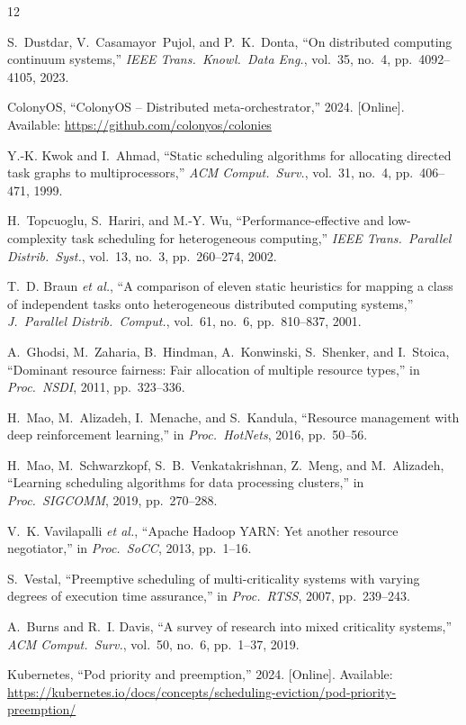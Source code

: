 \documentclass[conference]{IEEEtran}
\begin{document}


\begin{thebibliography}{12}

S.~Dustdar, V.~Casamayor~Pujol, and P.~K.~Donta, ``On distributed computing continuum systems,'' \emph{IEEE Trans.\ Knowl.\ Data Eng.}, vol.~35, no.~4, pp.~4092--4105, 2023.

ColonyOS, ``ColonyOS -- Distributed meta-orchestrator,'' 2024. [Online]. Available: \url{https://github.com/colonyos/colonies}

Y.-K. Kwok and I.~Ahmad, ``Static scheduling algorithms for allocating directed task graphs to multiprocessors,'' \emph{ACM Comput.\ Surv.}, vol.~31, no.~4, pp.~406--471, 1999.

H.~Topcuoglu, S.~Hariri, and M.-Y. Wu, ``Performance-effective and low-complexity task scheduling for heterogeneous computing,'' \emph{IEEE Trans.\ Parallel Distrib.\ Syst.}, vol.~13, no.~3, pp.~260--274, 2002.

T.~D. Braun \emph{et al.}, ``A comparison of eleven static heuristics for mapping a class of independent tasks onto heterogeneous distributed computing systems,'' \emph{J.\ Parallel Distrib.\ Comput.}, vol.~61, no.~6, pp.~810--837, 2001.

A.~Ghodsi, M.~Zaharia, B.~Hindman, A.~Konwinski, S.~Shenker, and I.~Stoica, ``Dominant resource fairness: Fair allocation of multiple resource types,'' in \emph{Proc.\ NSDI}, 2011, pp.~323--336.

H.~Mao, M.~Alizadeh, I.~Menache, and S.~Kandula, ``Resource management with deep reinforcement learning,'' in \emph{Proc.\ HotNets}, 2016, pp.~50--56.

H.~Mao, M.~Schwarzkopf, S.~B.~Venkatakrishnan, Z.~Meng, and M.~Alizadeh, ``Learning scheduling algorithms for data processing clusters,'' in \emph{Proc.\ SIGCOMM}, 2019, pp.~270--288.

V.~K. Vavilapalli \emph{et al.}, ``Apache Hadoop YARN: Yet another resource negotiator,'' in \emph{Proc.\ SoCC}, 2013, pp.~1--16.

S.~Vestal, ``Preemptive scheduling of multi-criticality systems with varying degrees of execution time assurance,'' in \emph{Proc.\ RTSS}, 2007, pp.~239--243.

A.~Burns and R.~I. Davis, ``A survey of research into mixed criticality systems,'' \emph{ACM Comput.\ Surv.}, vol.~50, no.~6, pp.~1--37, 2019.

Kubernetes, ``Pod priority and preemption,'' 2024. [Online]. Available: \url{https://kubernetes.io/docs/concepts/scheduling-eviction/pod-priority-preemption/}

\end{thebibliography}
\end{document}
